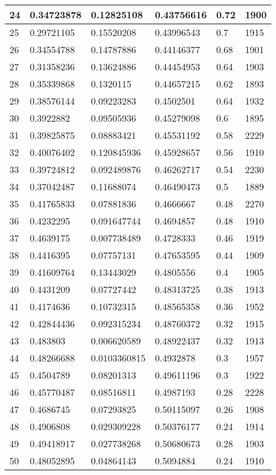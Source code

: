 \begin{longtable}{|l|l|l|l|l|l|}
24 & 0.34723878 & 0.12825108 & 0.43756616 & 0.72 & 1900 \\ \hline 
25 & 0.29721105 & 0.15520208 & 0.43996543 & 0.7 & 1915 \\ \hline 
26 & 0.34554788 & 0.14787886 & 0.44146377 & 0.68 & 1901 \\ \hline 
27 & 0.31358236 & 0.13624886 & 0.44454953 & 0.64 & 1903 \\ \hline 
28 & 0.35339868 & 0.1320115 & 0.44657215 & 0.62 & 1893 \\ \hline 
29 & 0.38576144 & 0.09223283 & 0.4502501 & 0.64 & 1932 \\ \hline 
30 & 0.3922882 & 0.09505936 & 0.45279098 & 0.6 & 1895 \\ \hline 
31 & 0.39825875 & 0.08883421 & 0.45531192 & 0.58 & 2229 \\ \hline 
32 & 0.40076402 & 0.120845936 & 0.45928657 & 0.56 & 1910 \\ \hline 
33 & 0.39724812 & 0.092489876 & 0.46262717 & 0.54 & 2230 \\ \hline 
34 & 0.37042487 & 0.11688074 & 0.46490473 & 0.5 & 1889 \\ \hline 
35 & 0.41765833 & 0.07881836 & 0.4666667 & 0.48 & 2270 \\ \hline 
36 & 0.4232295 & 0.091647744 & 0.4694857 & 0.48 & 1910 \\ \hline 
37 & 0.4639175 & 0.007738489 & 0.4728333 & 0.46 & 1919 \\ \hline 
38 & 0.4416395 & 0.07757131 & 0.47653595 & 0.44 & 1909 \\ \hline 
39 & 0.41609764 & 0.13443029 & 0.4805556 & 0.4 & 1905 \\ \hline 
40 & 0.4431209 & 0.07727442 & 0.48313725 & 0.38 & 1913 \\ \hline 
41 & 0.4174636 & 0.10732315 & 0.48565358 & 0.36 & 1952 \\ \hline 
42 & 0.42844436 & 0.092315234 & 0.48760372 & 0.32 & 1915 \\ \hline 
43 & 0.483803 & 0.006620589 & 0.48922437 & 0.32 & 1913 \\ \hline 
44 & 0.48266688 & 0.0103360815 & 0.4932878 & 0.3 & 1957 \\ \hline 
45 & 0.4504789 & 0.08201313 & 0.49611196 & 0.3 & 1922 \\ \hline 
46 & 0.45770487 & 0.08516811 & 0.4987193 & 0.28 & 2228 \\ \hline 
47 & 0.4686745 & 0.07293825 & 0.50115097 & 0.26 & 1908 \\ \hline 
48 & 0.4906808 & 0.029309228 & 0.50376177 & 0.24 & 1914 \\ \hline 
49 & 0.49418917 & 0.027738268 & 0.50680673 & 0.28 & 1903 \\ \hline 
50 & 0.48052895 & 0.04864143 & 0.5094884 & 0.24 & 1910 \\ \hline 
\end{longtable}